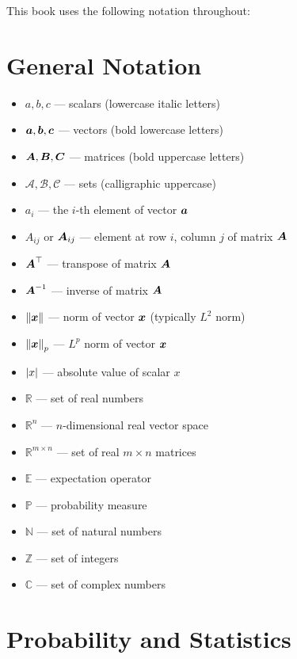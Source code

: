 This book uses the following notation throughout:

\section*{General Notation}

\begin{itemize}[leftmargin=2em]
    \item $a, b, c$ --- scalars (lowercase italic letters)
    \item $\boldsymbol{a}, \boldsymbol{b}, \boldsymbol{c}$ --- vectors (bold lowercase letters)
    \item $\boldsymbol{A}, \boldsymbol{B}, \boldsymbol{C}$ --- matrices (bold uppercase letters)
    \item $\mathcal{A}, \mathcal{B}, \mathcal{C}$ --- sets (calligraphic uppercase)
    \item $a_i$ --- the $i$-th element of vector $\boldsymbol{a}$
    \item $A_{ij}$ or $\boldsymbol{A}_{ij}$ --- element at row $i$, column $j$ of matrix $\boldsymbol{A}$
    \item $\boldsymbol{A}^\top$ --- transpose of matrix $\boldsymbol{A}$
    \item $\boldsymbol{A}^{-1}$ --- inverse of matrix $\boldsymbol{A}$
    \item $\left\lVert\boldsymbol{x}\right\rVert$ --- norm of vector $\boldsymbol{x}$ (typically $L^2$ norm)
    \item $\left\lVert\boldsymbol{x}\right\rVert_p$ --- $L^p$ norm of vector $\boldsymbol{x}$
    \item $\left|x\right|$ --- absolute value of scalar $x$
    \item $\mathbb{R}$ --- set of real numbers
    \item $\mathbb{R}^n$ --- $n$-dimensional real vector space
    \item $\mathbb{R}^{m \times n}$ --- set of real $m \times n$ matrices
    \item $\mathbb{E}$ --- expectation operator
    \item $\mathbb{P}$ --- probability measure
    \item $\mathbb{N}$ --- set of natural numbers
    \item $\mathbb{Z}$ --- set of integers
    \item $\mathbb{C}$ --- set of complex numbers
\end{itemize}

\section*{Probability and Statistics}

